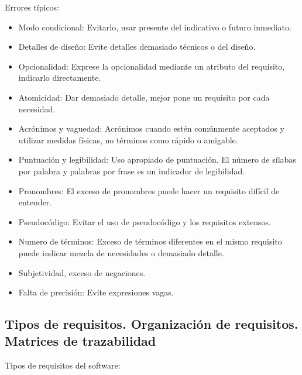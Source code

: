 \documentclass[12pt, twoside, openright]{report} %
\begin{document}
Errores típicos:

\begin{itemize}
	\item Modo condicional: Evitarlo, usar presente del indicativo o futuro
	      inmediato.
	\item Detalles de diseño: Evite detalles demasiado técnicos o del
	      diseño.
	\item Opcionalidad: Exprese la opcionalidad mediante un atributo del
	      requisito, indicarlo directamente.
	\item Atomicidad: Dar demasiado detalle, mejor pone un requisito por
	      cada necesidad.
	\item Acrónimos y vaguedad: Acrónimos cuando estén comúnmente aceptados
	      y utilizar medidas físicas, no términos como rápido o amigable.
	\item Puntuación y legibilidad: Uso apropiado de puntuación. El número
	      de sílabas por palabra y palabras por frase es un indicador de
	      legibilidad.
	\item Pronombres: El exceso de pronombres puede hacer un requisito
	      difícil de entender.
	\item Pseudocódigo: Evitar el uso de pseudocódigo y los requisitos
	      extensos.
	\item Numero de términos: Exceso de términos diferentes en el mismo
	      requisito puede indicar mezcla de necesidades o demasiado detalle.
	\item Subjetividad, exceso de negaciones.
	\item Falta de precisión: Evite expresiones vagas.
\end{itemize}
\pagebreak
\subsection{Tipos de requisitos. Organización de requisitos. Matrices de trazabilidad}


Tipos de requisitos del software:
\end{document}
